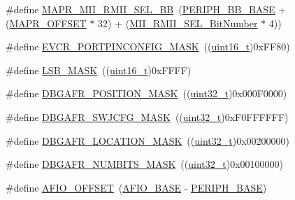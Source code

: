 \begin{DoxyCompactItemize}
\item 
\#define \hyperlink{group___g_p_i_o___private___defines_ga00e75433e8a45d7a55c021397cb85aa9}{M\+A\+P\+R\+\_\+\+M\+I\+I\+\_\+\+R\+M\+I\+I\+\_\+\+S\+E\+L\+\_\+\+BB}~(\hyperlink{openmotestm_2library_2inc_2stm32f10x__map_8h_aed7efc100877000845c236ccdc9e144a}{P\+E\+R\+I\+P\+H\+\_\+\+B\+B\+\_\+\+B\+A\+SE} + (\hyperlink{group___g_p_i_o___private___defines_ga472f80f63d09e365d283675f3466c8a1}{M\+A\+P\+R\+\_\+\+O\+F\+F\+S\+ET} $\ast$ 32) + (\hyperlink{group___g_p_i_o___private___defines_gad4a9bbd669109039291f942d923ff8ae}{M\+I\+I\+\_\+\+R\+M\+I\+I\+\_\+\+S\+E\+L\+\_\+\+Bit\+Number} $\ast$ 4))
\item 
\#define \hyperlink{group___g_p_i_o___private___defines_ga97d20e77a588a767e1a775dd4299d1c5}{E\+V\+C\+R\+\_\+\+P\+O\+R\+T\+P\+I\+N\+C\+O\+N\+F\+I\+G\+\_\+\+M\+A\+SK}~((\hyperlink{_p_e___types_8h_a1f1825b69244eb3ad2c7165ddc99c956}{uint16\+\_\+t})0x\+F\+F80)
\item 
\#define \hyperlink{group___g_p_i_o___private___defines_ga338d54179ac0da2af2363e3a930bf374}{L\+S\+B\+\_\+\+M\+A\+SK}~((\hyperlink{_p_e___types_8h_a1f1825b69244eb3ad2c7165ddc99c956}{uint16\+\_\+t})0x\+F\+F\+F\+F)
\item 
\#define \hyperlink{group___g_p_i_o___private___defines_gafa4eba58b1839413acb4591da00e7559}{D\+B\+G\+A\+F\+R\+\_\+\+P\+O\+S\+I\+T\+I\+O\+N\+\_\+\+M\+A\+SK}~((\hyperlink{_p_e___types_8h_a33594304e786b158f3fb30289278f5af}{uint32\+\_\+t})0x000\+F0000)
\item 
\#define \hyperlink{group___g_p_i_o___private___defines_ga47a1cd3c0505a7be3e161671237d8460}{D\+B\+G\+A\+F\+R\+\_\+\+S\+W\+J\+C\+F\+G\+\_\+\+M\+A\+SK}~((\hyperlink{_p_e___types_8h_a33594304e786b158f3fb30289278f5af}{uint32\+\_\+t})0x\+F0\+F\+F\+F\+F\+F\+F)
\item 
\#define \hyperlink{group___g_p_i_o___private___defines_gaab83406f875057e96458940ca9519b7d}{D\+B\+G\+A\+F\+R\+\_\+\+L\+O\+C\+A\+T\+I\+O\+N\+\_\+\+M\+A\+SK}~((\hyperlink{_p_e___types_8h_a33594304e786b158f3fb30289278f5af}{uint32\+\_\+t})0x00200000)
\item 
\#define \hyperlink{group___g_p_i_o___private___defines_gaea2fa480dea4d6e061eaa1417a9196dc}{D\+B\+G\+A\+F\+R\+\_\+\+N\+U\+M\+B\+I\+T\+S\+\_\+\+M\+A\+SK}~((\hyperlink{_p_e___types_8h_a33594304e786b158f3fb30289278f5af}{uint32\+\_\+t})0x00100000)
\item 
\#define \hyperlink{group___g_p_i_o___private___defines_ga0ecdd0dd5180e1ee385c22f66a2cd660}{A\+F\+I\+O\+\_\+\+O\+F\+F\+S\+ET}~(\hyperlink{openmotestm_2library_2inc_2stm32f10x__map_8h_a5f7e3eacfcf4c313c25012795148a680}{A\+F\+I\+O\+\_\+\+B\+A\+SE} -\/ \hyperlink{openmotestm_2library_2inc_2stm32f10x__map_8h_a9171f49478fa86d932f89e78e73b88b0}{P\+E\+R\+I\+P\+H\+\_\+\+B\+A\+SE})

\end{DoxyCompactItemize}
